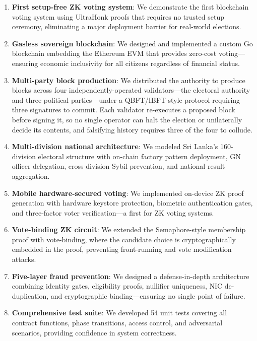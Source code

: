 \begin{enumerate}
    \item \textbf{First setup-free ZK voting system}: We demonstrate the first blockchain voting system using UltraHonk proofs that requires no trusted setup ceremony, eliminating a major deployment barrier for real-world elections.
    
    \item \textbf{Gasless sovereign blockchain}: We designed and implemented a custom Go blockchain embedding the Ethereum EVM that provides zero-cost voting---ensuring economic inclusivity for all citizens regardless of financial status.

    \item \textbf{Multi-party block production}: We distributed the authority to produce blocks across four independently-operated validators---the electoral authority and three political parties---under a QBFT/IBFT-style protocol requiring three signatures to commit. Each validator re-executes a proposed block before signing it, so no single operator can halt the election or unilaterally decide its contents, and falsifying history requires three of the four to collude.
    
    \item \textbf{Multi-division national architecture}: We modeled Sri Lanka's 160-division electoral structure with on-chain factory pattern deployment, GN officer delegation, cross-division Sybil prevention, and national result aggregation.
    
    \item \textbf{Mobile hardware-secured voting}: We implemented on-device ZK proof generation with hardware keystore protection, biometric authentication gates, and three-factor voter verification---a first for ZK voting systems.
    
    \item \textbf{Vote-binding ZK circuit}: We extended the Semaphore-style membership proof with vote-binding, where the candidate choice is cryptographically embedded in the proof, preventing front-running and vote modification attacks.
    
    \item \textbf{Five-layer fraud prevention}: We designed a defense-in-depth architecture combining identity gates, eligibility proofs, nullifier uniqueness, NIC de-duplication, and cryptographic binding---ensuring no single point of failure.
    
    \item \textbf{Comprehensive test suite}: We developed 54 unit tests covering all contract functions, phase transitions, access control, and adversarial scenarios, providing confidence in system correctness.
\end{enumerate}

